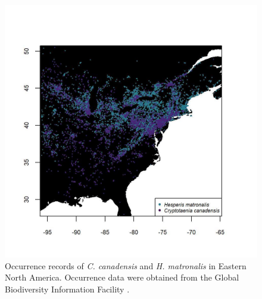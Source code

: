 \documentclass{article}[11pt]
\begin{document}
\begin{figure}[h!] 
    \centering
\includegraphics[width=.95\textwidth]{..//figure/cchhmmap4.jpeg}
\caption{Occurrence records of \textit{C. canadensis} and \textit{H. matronalis} in Eastern North America. Occurrence data were obtained from the Global Biodiversity Information Facility \citep[GBIF,][]{gbif}.} 
   \label{fig:map}
\end{figure}
\end{document}
